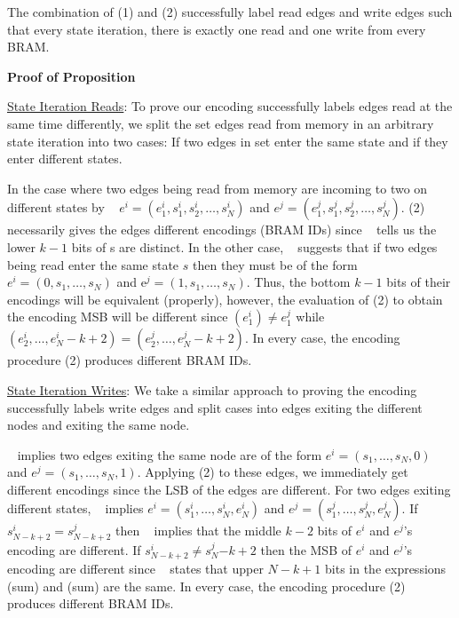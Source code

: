 \begin{Thm:Proposition}
The combination of (1) and (2) successfully label read edges and write edges such that every state iteration, there is exactly one read and one write from every BRAM.
\label{Thm:Proposition:DecoderHW:Prop1}
\end{Thm:Proposition}

\textbf{Proof of Proposition}

\underline{State Iteration Reads}: To prove our encoding successfully labels edges read at the same time differently, we split the set edges read from memory in an arbitrary state iteration into two cases: If two edges in set enter the same state and if they enter different states. 

In the case where two edges being read from memory are incoming to two on different states by \Lemma~ $e^i = (e^i_1, s^i_1, s^i_2, \ldots, s^i_N)$ and $e^j = (e^j_1, s^j_1, s^j_2, \ldots, s^j_N)$. (2) necessarily gives the edges different encodings (BRAM IDs) since \Lemma~ tells us the lower $k-1$ bits of s are distinct. In the other case, \Lemma~ suggests that if two edges being read enter the same state $s$ then they must be of the form $e^i=(0, s_1, \ldots, s_N)$ and e$^j=(1, s_1, \ldots, s_N)$. Thus, the bottom $k-1$ bits of their encodings will be equivalent (properly), however, the evaluation of (2) to obtain the encoding MSB will be different since $(e^i_1) \neq e^j_1$ while $(e^i_2, \ldots, e^i_N-k+2) = (e^j_2, \ldots, e^j_N-k+2)$. In every case, the encoding procedure (2) produces different BRAM IDs. 

\underline{State Iteration Writes}: We take a similar approach to proving the encoding successfully labels write edges and split cases into edges exiting the different nodes and exiting the same node. 

\Lemma~ implies two edges exiting the same node are of the form $e^i = (s_1, \ldots, s_N, 0)$ and $e^j = (s_1, \ldots, s_N, 1)$. Applying (2) to these edges, we immediately get different encodings since the LSB of the edges are different. For two edges exiting different states, \Lemma~ implies $e^i = (s^i_1, \ldots, s^i_N, e^i_N)$ and $e^j = (s^j_1, \ldots, s^j_N, e^j_N)$. If $s^i_{N-k+2} = s^j_{N-k+2}$ then \Lemma~ implies that the middle $k-2$ bits of $e^i$ and $e^j$’s encoding are different. If $s^i_{N-k+2} \neq s^j_N{-k+2}$ then the MSB of $e^i$ and $e^j$’s encoding are different since \Lemma~ states that upper ${N-k+1}$ bits in the expressions (sum) and (sum) are the same. In every case, the encoding procedure (2) produces different BRAM IDs.

